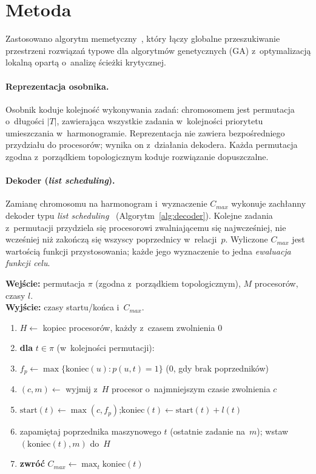 \documentclass[pdflatex,sn-mathphys,Numbered]{sn-jnl}
\newenvironment{pseudo}
  {\begin{enumerate}[leftmargin=2.6em, itemsep=1pt, topsep=2pt,
     label=\scriptsize\sffamily\arabic*]\small}
  {\end{enumerate}}
\newcommand{\Kw}[1]{\textbf{#1}}%
\newcommand{\In}[1]{\textbf{Wejście:} #1}
\newcommand{\Out}[1]{\textbf{Wyjście:} #1}
\newcommand{\ind}{\hspace*{1.5em}}%
\begin{document}
\section{Metoda}
\label{sec:metoda}
Zastosowano algorytm memetyczny~\cite{moscato1989}, który łączy globalne
przeszukiwanie przestrzeni rozwiązań typowe dla algorytmów genetycznych (GA)
z~optymalizacją lokalną opartą o~analizę ścieżki krytycznej.

\paragraph{Reprezentacja osobnika.}
Osobnik koduje kolejność wykonywania zadań: chromosomem jest permutacja
o~długości $|T|$, zawierająca wszystkie zadania w~kolejności priorytetu
umieszczania w~harmonogramie. Reprezentacja nie zawiera bezpośredniego przydziału
do procesorów; wynika on z~działania dekodera. Każda permutacja zgodna
z~porządkiem topologicznym koduje rozwiązanie dopuszczalne.

\paragraph{Dekoder (\textit{list scheduling}).}
Zamianę chromosomu na harmonogram i~wyznaczenie $C_{max}$ wykonuje zachłanny
dekoder typu \textit{list scheduling}~\cite{graham1969}
(Algorytm~\ref{alg:decoder}). Kolejne zadania z~permutacji przydziela się
procesorowi zwalniającemu się najwcześniej, nie wcześniej niż zakończą się
wszyscy poprzednicy w~relacji~$p$. Wyliczone $C_{max}$ jest wartością funkcji
przystosowania; każde jego wyznaczenie to jedna \emph{ewaluacja funkcji celu}.

\begin{algorithm}[H]
\caption{Dekoder list scheduling}
\label{alg:decoder}
\In{permutacja $\pi$ (zgodna z~porządkiem topologicznym), $M$ procesorów, czasy $l$.}\\
\Out{czasy startu/końca i~$C_{max}$.}
\begin{pseudo}
\item $H \gets$ kopiec procesorów, każdy z~czasem zwolnienia $0$
\item \Kw{dla} $t \in \pi$ (w~kolejności permutacji):
\item \ind $f_p \gets \max\{\text{koniec}(u) : p(u,t)=1\}$ \quad($0$, gdy brak poprzedników)
\item \ind $(c, m) \gets$ wyjmij z~$H$ procesor o~najmniejszym czasie zwolnienia $c$
\item \ind $\text{start}(t) \gets \max(c, f_p)$;\quad $\text{koniec}(t) \gets \text{start}(t) + l(t)$
\item \ind zapamiętaj poprzednika maszynowego $t$ (ostatnie zadanie na~$m$); wstaw $(\text{koniec}(t), m)$ do~$H$
\item \Kw{zwróć} $C_{max} \gets \max_t \text{koniec}(t)$
\end{pseudo}
\end{algorithm}
\end{document}
